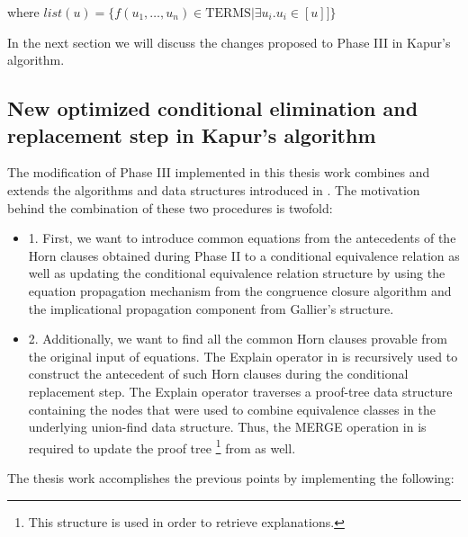 where $list(u) = \{ f(u_1, \dots, u_n) \in \text{TERMS} 
| \exists u_i . u_i \in [u] ] \}$


In the next section we will discuss the changes proposed to 
Phase III in Kapur's algorithm. 

\subsection{New optimized conditional elimination 
and replacement step in Kapur's algorithm}

The modification of Phase III implemented in this thesis work
combines and extends the algorithms and data structures introduced
in \cite{GALLIER1987233, 10.1007/978-3-540-32033-3_33}.
The motivation behind the combination of these two procedures
is twofold: 

\begin{itemize}
  \item[] 1. First, we want to introduce 
    common equations from the antecedents of 
    the Horn clauses obtained during Phase II
    to a conditional equivalence relation as well
    as updating the conditional equivalence relation 
    structure by using the equation propagation mechanism
    from the congruence closure algorithm and 
    the implicational propagation component 
    from Gallier's structure.
  \item[] 2. Additionally, we want to find all the common
    Horn clauses provable from the original input 
    of equations. The Explain operator in 
    \cite{10.1007/978-3-540-32033-3_33} is recursively 
    used to construct 
    the antecedent of such Horn clauses during the 
    conditional replacement step. The Explain operator 
    traverses a proof-tree data structure containing the nodes
    that were used to combine equivalence classes 
    in the underlying union-find data structure.
    Thus, the MERGE operation in \cite{GALLIER1987233} is
    required to update the proof tree 
    \footnote{This structure is used in order to retrieve
    explanations.}
    from \cite{10.1007/978-3-540-32033-3_33} as well.
\end{itemize}

The thesis work accomplishes the previous
points by implementing the following:

